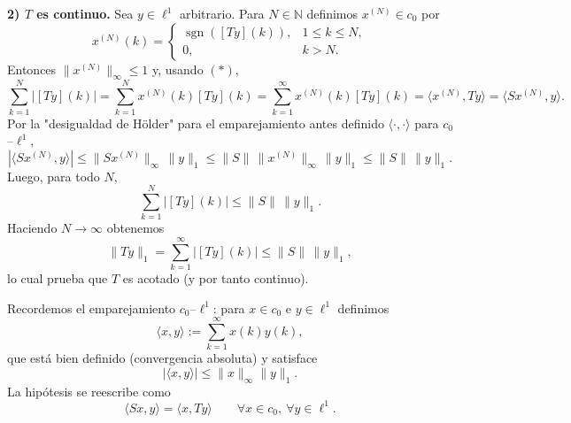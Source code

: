 \documentclass[12pt]{article}
\begin{document}
\begin{ejercicio}[2 puntos]
\begin{description}
            \textbf{2) $T$ es continuo.}
            Sea $y\in \ell^1$ arbitrario. Para $N\in\mathbb{N}$ definimos $x^{(N)}\in c_0$ por
            \begin{equation*}
            x^{(N)}(k)=
            \begin{cases}
            \operatorname{sgn}([Ty](k)), & 1\le k\le N,\\
            0, & k>N.
            \end{cases}
            \end{equation*}
            Entonces $\|x^{(N)}\|_\infty\le 1$ y, usando $(\ast)$,
            \begin{equation*}
            \sum_{k=1}^{N} |[Ty](k)|
            = \sum_{k=1}^{N} x^{(N)}(k)[Ty](k)
            = \sum_{k=1}^{\infty} x^{(N)}(k)[Ty](k)
            = \langle x^{(N)},Ty\rangle
            = \langle Sx^{(N)},y\rangle.
            \end{equation*}
            Por la "desigualdad de Hölder" para el emparejamiento antes definido $\langle \cdot , \cdot \rangle$ para $c_0$--$\ell^1$,
            \begin{equation*}
            |\langle Sx^{(N)},y\rangle|
            \le \|Sx^{(N)}\|_\infty\,\|y\|_1
            \le \|S\|\,\|x^{(N)}\|_\infty\,\|y\|_1
            \le \|S\|\,\|y\|_1.
            \end{equation*}
            Luego, para todo $N$,
            \begin{equation*}
            \sum_{k=1}^{N} |[Ty](k)| \le \|S\|\,\|y\|_1.
            \end{equation*}
            Haciendo $N\to\infty$ obtenemos
            \begin{equation*}
            \|Ty\|_1=\sum_{k=1}^{\infty}|[Ty](k)| \le \|S\|\,\|y\|_1,
            \end{equation*}
            lo cual prueba que $T$ es acotado (y por tanto continuo).

        \item[Opción 2: Usando el teorema de la gráfica cerrada.]
        
            Recordemos el emparejamiento $c_0$--$\ell^1$:
            para $x\in c_0$ e $y\in \ell^1$ definimos
            \begin{equation*}
            \langle x,y\rangle:=\sum_{k=1}^\infty x(k)y(k),
            \end{equation*}
            que está bien definido (convergencia absoluta) y satisface
            \begin{equation*}
            |\langle x,y\rangle|\le \|x\|_\infty\|y\|_1.
            \end{equation*}
            La hipótesis se reescribe como
            \begin{equation*}
            \langle Sx,y\rangle=\langle x,Ty\rangle
            \qquad \forall x\in c_0,\ \forall y\in \ell^1.
            \tag{$\ast$}
            \end{equation*}
            

\end{description}
\end{ejercicio}
\end{document}
